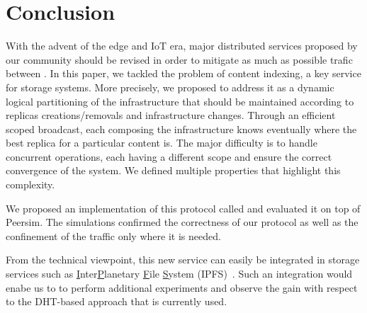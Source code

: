 
\section{Conclusion}
\label{sec:conclusion}

With the advent of the edge and IoT era, major distributed services
proposed by our community should be revised in order to mitigate as
much as possible trafic between \processes.  In this paper, we tackled
the problem of content indexing, a key service for storage systems.
%
More precisely, we proposed to address it as a dynamic logical partitioning of the infrastructure
that should be maintained according to replicas creations/removals and
infrastructure changes. Through an efficient scoped broadcast, each
\process composing the infrastructure knows eventually where the best
replica for a particular content is. The major difficulty is to handle
concurrent operations, each having a different scope and ensure the
correct convergence of the system. We defined multiple properties that highlight this complexity.

We proposed an implementation of this protocol called \NAME and
evaluated it on top of Peersim. The simulations confirmed the
correctness of our protocol as well as the confinement of the traffic
only where it is needed.

% 
From the technical viewpoint, this new service can easily be
integrated in storage services such as
\underline{I}nter\underline{P}lanetary \underline{F}ile
\underline{S}ystem (IPFS)~\cite{henningsen2020mapping}.  Such an integration would enabe us to
to perform additional experiments and observe the gain with 
respect to the DHT-based approach that is currently used.

%


